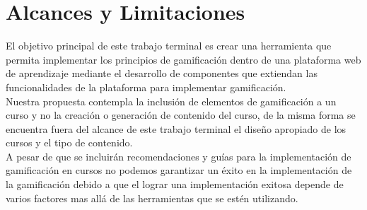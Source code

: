 \section{Alcances y Limitaciones} \label{sec:alcancesLimitaciones}

 El objetivo principal de este trabajo terminal es crear una herramienta que permita
 implementar los principios de gamificación dentro de una plataforma web de aprendizaje
 mediante el desarrollo de componentes que extiendan las funcionalidades de la plataforma
 para implementar gamificación.\\

 \noindent Nuestra propuesta contempla la inclusión de elementos de gamificación
 a un curso y no la creación o generación de contenido del curso, de la misma forma
 se encuentra fuera del alcance de este trabajo terminal el diseño apropiado de los
 cursos y el tipo de contenido.\\

 \noindent A pesar de que se incluirán recomendaciones y guías para la implementación de gamificación
 en cursos no podemos garantizar un éxito en la implementación de la gamificación debido a
 que el lograr una implementación exitosa depende de varios factores mas allá de las herramientas
 que se estén utilizando.

